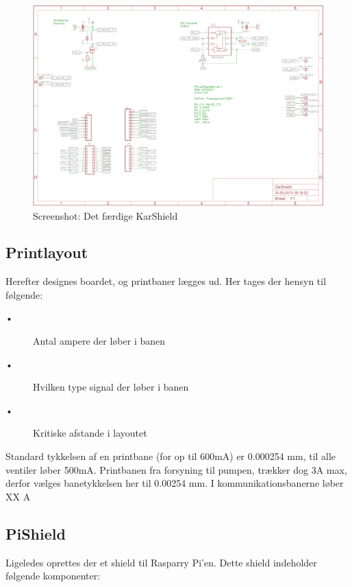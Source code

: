 \newpage
\begin{figure}[H]
	\centering
	\includegraphics[scale=1]{../Hardware/Shields/Screenshots/OeShield}
	\caption{Screenshot: Det færdige KarShield}
	\label{screenshot:OeShield}
\end{figure}


\newpage
\subsection{Printlayout}

Herefter designes boardet, og printbaner lægges ud. Her tages der hensyn til følgende: 

\begin{description}
 \item[•] Antal ampere der løber i banen
 \item[•] Hvilken type signal der løber i banen
 \item[•] Kritiske afstande i layoutet
\end{description}

Standard tykkelsen af en printbane (for op til 600mA) er 0.000254 mm, til alle ventiler løber 500mA. Printbanen fra forsyning til pumpen, trækker dog 3A max, derfor vælges banetykkelsen her til 0.00254 mm.
I kommunikationsbanerne løber XX A

\subsection{PiShield}

Ligeledes oprettes der et shield til Rasparry Pi'en. Dette shield indeholder følgende komponenter: 

